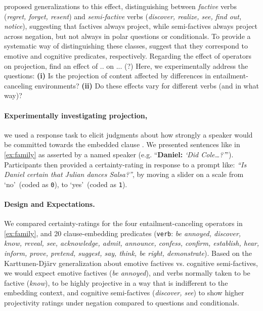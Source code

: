 \documentclass[12pt, a4paper]{scrartcl}
\begin{document}
	\citet{karttunen_observations_1971} proposed generalizations to this effect, distinguishing between \emph{factive} verbs (\emph{regret, forget, resent}) and \emph{semi-factive} verbs (\emph{discover, realize, see, find out, notice}), suggesting that factives always project, while semi-factives always project across negation, but not always in polar questions or conditionals. To provide a systematic way of distinguishing these classes, \cite{djarv_cognitive_2018} suggest that they correspond to emotive and cognitive predicates, respectively. Regarding the effect of operators on projection, \cite{smith_relationship_2014} find an effect of .. on ... (?) Here, we experimentally address the questions: \textbf{(i)} Is the projection of content affected by differences in entailment-canceling environments? \textbf{(ii)} Do these effects vary for different verbs (and in what way)?

\vspace{-\baselineskip}
\paragraph{Experimentally investigating projection,} \hspace{-1em}
	we used a response task to elicit judgments about how strongly a speaker would be committed towards the embedded clause \citep[from][]{tonhauser_prosodic_2016}. We presented sentences like in \ref{ex:family} as asserted by a named speaker (e.g. “\textbf{Daniel:} \emph{\lq Did Cole\dots?\rq}”). Participants then provided a certainty-rating in response to a prompt like: \emph{“Is Daniel certain that Julian dances Salsa?”}, by moving a slider on a scale from \lq no\rq\ (coded as \texttt{0}), to \lq yes\rq\ (coded as \texttt{1}). 


\vspace{-\baselineskip}
\paragraph{Design and Expectations.} \hspace{-1em}
	We compared certainty-ratings for the four entailment-canceling operators in \ref{ex:family}, and 20 clause-embedding predicates (\texttt{verb}: {\em be annoyed, discover, know, reveal, see, acknowledge, admit, announce, confess, confirm, establish, hear, inform, prove, pretend, suggest, say, think, be right, demonstrate}).
	Based on the Karttunen-Djärv generalization about emotive factives vs. cognitive semi-factives, we would expect emotive factives (\emph{be annoyed}), and verbs normally taken to be factive (\emph{know}), to be highly projective in a way that is indifferent to the embedding context, and cognitive semi-factives (\emph{discover, see}) to show higher projectivity ratings under negation compared to questions and conditionals.
\end{document}
